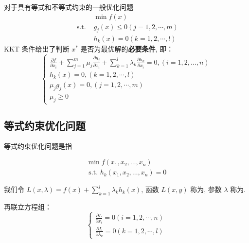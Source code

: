 \begin{theorem}[KKT条件]
    对于具有等式和不等式约束的一般优化问题
\begin{equation}
\begin{aligned}
&\min f({x}) \\
\text { s.t. }& g_{j}({x}) \leq 0(j=1,2, \cdots, m) \\
&h_{k}({x})=0(k=1,2, \cdots, l)
\end{aligned}
\end{equation}
KKT 条件给出了判断 $ {x}^{*} $ 是否为最优解的\textbf{必要条件}, 即：
\begin{equation}
\left\{\begin{array}{l}
\frac{\partial f}{\partial x_{i}}+\sum_{j=1}^{m} \mu_{j} \frac{\partial g_{j}}{\partial x_{i}}+\sum_{k=1}^{l} \lambda_{k} \frac{\partial h_{k}}{\partial x_{i}}=0,(i=1,2, \ldots, n) \\
h_{k}({x})=0,(k=1,2, \cdots, l) \\
\mu_{j} g_{j}({x})=0,(j=1,2, \cdots, m) \\
\mu_{j} \geq 0
\end{array}\right.
\end{equation}
\end{theorem}


\subsection{等式约束优化问题}

等式约束优化问题是指

\begin{problem}[等式约束优化问题]
    \begin{equation}
\begin{array}{l}
\min f\left(x_{1}, x_{2}, \ldots, x_{n}\right) \\
\text { s.t. } h_{k}\left(x_{1}, x_{2}, \ldots, x_{n}\right)=0
\end{array}
\end{equation}
\end{problem}


我们令 $ L({x}, \lambda)=f({x})+\sum_{k=1}^{l} \lambda_{k} h_{k}({x}) $, 函数 $ L(x, y) $ 称为, 参数 $ \lambda $ 称为.

再联立方程组： 
\begin{equation} \left\{\begin{array}{l}\frac{\partial L}{\partial x_{i}}=0(i=1,2, \cdots, n) \\ \frac{\partial L}{\partial \lambda_{k}}=0(k=1,2, \cdots, l)\end{array}\right. \end{equation}

